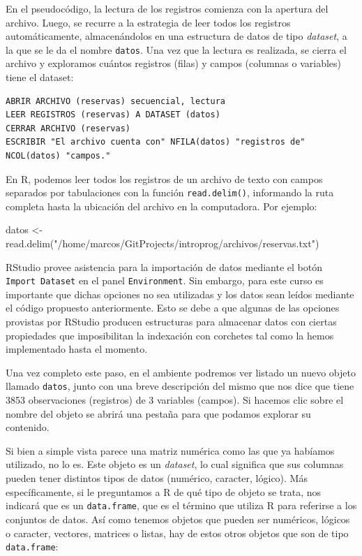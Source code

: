 \documentclass[
]{book}
\newenvironment{Shaded}{\begin{snugshade}}{\end{snugshade}}
\newcommand{\FunctionTok}[1]{\textcolor[rgb]{0.00,0.00,0.00}{#1}}
\newcommand{\NormalTok}[1]{#1}
\newcommand{\OtherTok}[1]{\textcolor[rgb]{0.56,0.35,0.01}{#1}}
\newcommand{\StringTok}[1]{\textcolor[rgb]{0.31,0.60,0.02}{#1}}
\begin{document}
En el pseudocódigo, la lectura de los registros comienza con la apertura del archivo. Luego, se recurre a la estrategia de leer todos los registros automáticamente, almacenándolos en una estructura de datos de tipo \emph{dataset}, a la que se le da el nombre \texttt{datos}. Una vez que la lectura es realizada, se cierra el archivo y exploramos cuántos registros (filas) y campos (columnas o variables) tiene el dataset:

\begin{verbatim}
ABRIR ARCHIVO (reservas) secuencial, lectura
LEER REGISTROS (reservas) A DATASET (datos)
CERRAR ARCHIVO (reservas)
ESCRIBIR "El archivo cuenta con" NFILA(datos) "registros de" NCOL(datos) "campos." 
\end{verbatim}

En R, podemos leer todos los registros de un archivo de texto con campos separados por tabulaciones con la función \texttt{read.delim()}, informando la ruta completa hasta la ubicación del archivo en la computadora. Por ejemplo:

\begin{Shaded}
\begin{Highlighting}[]
\NormalTok{datos }\OtherTok{\textless{}{-}} \FunctionTok{read.delim}\NormalTok{(}\StringTok{"/home/marcos/GitProjects/introprog/archivos/reservas.txt"}\NormalTok{)}
\end{Highlighting}
\end{Shaded}

RStudio provee asistencia para la importación de datos mediante el botón \texttt{Import\ Dataset} en el panel \texttt{Environment}. Sin embargo, para este curso es importante que dichas opciones no sea utilizadas y los datos sean leídos mediante el código propuesto anteriormente. Esto se debe a que algunas de las opciones provistas por RStudio producen estructuras para almacenar datos con ciertas propiedades que imposibilitan la indexación con corchetes tal como la hemos implementado hasta el momento.

Una vez completo este paso, en el ambiente podremos ver listado un nuevo objeto llamado \texttt{datos}, junto con una breve descripción del mismo que nos dice que tiene 3853 observaciones (registros) de 3 variables (campos). Si hacemos clic sobre el nombre del objeto se abrirá una pestaña para que podamos explorar su contenido.

Si bien a simple vista parece una matriz numérica como las que ya habíamos utilizado, no lo es. Este objeto es un \emph{dataset}, lo cual significa que sus columnas pueden tener distintos tipos de datos (numérico, caracter, lógico). Más específicamente, si le preguntamos a R de qué tipo de objeto se trata, nos indicará que es un \texttt{data.frame}, que es el término que utiliza R para referirse a los conjuntos de datos. Así como tenemos objetos que pueden ser numéricos, lógicos o caracter, vectores, matrices o listas, hay de estos otros objetos que son de tipo \texttt{data.frame}:
\end{document}
